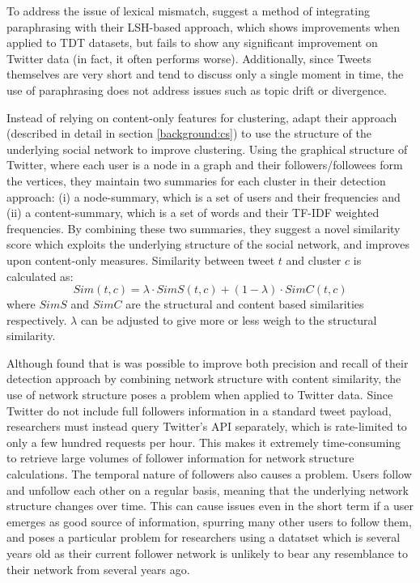 To address the issue of lexical mismatch, \cite{Petrovic:2012:UPI:2382029.2382072} suggest a method of integrating paraphrasing with their LSH-based approach, which shows improvements when applied to TDT datasets, but fails to show any significant improvement on Twitter data (in fact, it often performs worse).
Additionally, since Tweets themselves are very short and tend to discuss only a single moment in time, the use of paraphrasing does not address issues such as topic drift or divergence.

Instead of relying on content-only features for clustering, \cite{Aggarwal12} adapt their approach (described in detail in section \ref{background:cs}) to use the structure of the underlying social network to improve clustering.
Using the graphical structure of Twitter, where each user is a node in a graph and their followers/followees form the vertices, they maintain two summaries
for each cluster in their detection approach: (i) a node-summary, which is a set of users and their frequencies and (ii) a content-summary, which is a set of words and their TF-IDF \citep{Salton:1988:TAA:54259.54260} weighted frequencies.
By combining these two summaries, they suggest a novel similarity score which exploits the underlying structure of the social network, and improves upon content-only measures.
Similarity between tweet $t$ and cluster $c$ is calculated as:
\begin{displaymath}
	Sim(t, c) = \lambda \cdot SimS(t, c) + (1 - \lambda) \cdot SimC(t, c)
\end{displaymath}
where $SimS$ and $SimC$ are the structural and content based similarities respectively.
$\lambda$ can be adjusted to give more or less weigh to the structural similarity.

Although \cite{Aggarwal12} found that is was possible to improve both precision and recall of their detection approach by combining network structure with content similarity, the use of network structure poses a problem when applied to Twitter data.
Since Twitter do not include full followers information in a standard tweet payload, researchers must instead query Twitter's API separately, which is rate-limited to only a few hundred requests per hour.
This makes it extremely time-consuming to retrieve large volumes of follower information for network structure calculations.
The temporal nature of followers also causes a problem.
Users follow and unfollow each other on a regular basis, meaning that the underlying network structure changes over time.
This can cause issues even in the short term if a user emerges as good source of information, spurring many other users to follow them, and poses a particular problem for researchers using a datatset which is several years old as their current follower network is unlikely to bear any resemblance to their network from several years ago.


